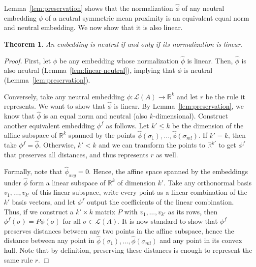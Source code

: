 \documentclass[10pt,letterpaper]{article}
\newcommand{\calL}{{\mathcal{L}}}
\newcommand{\rank}{{\calL(A)}}
\newtheorem{theorem}{Theorem}
\begin{document}
Lemma~\ref{lem:preservation} shows that the normalization $\hat{\phi}$ of any neutral embedding $\phi$ of a neutral symmetric mean proximity is an equivalent equal norm and neutral embedding. We now show that it is also linear.  


\begin{theorem}
An embedding is neutral if and only if its normalization is linear. 
\label{thm:neutral-linear}
\end{theorem}
\begin{proof}
First, let $\phi$ be any embedding whose normalization $\hat{\phi}$ is linear. Then, $\hat{\phi}$ is also neutral (Lemma~\ref{lem:linear-neutral}), implying that $\phi$ is neutral (Lemma~\ref{lem:preservation}).

Conversely, take any neutral embedding $\phi : \rank \rightarrow \mathbb{R}^k$ and let $r$ be the rule it represents. We want to show that $\hat{\phi}$ is linear. By Lemma~\ref{lem:preservation}, we know that $\hat{\phi}$ is an equal norm and neutral (also $k$-dimensional). Construct another equivalent embedding $\phi^f$ as follows. Let $k' \le k$ be the dimension of the affine subspace of $\mathbb{R}^k$ spanned by the points $\hat{\phi}(\sigma_1),\ldots,\hat{\phi}(\sigma_{m!})$. If $k' = k$, then take $\phi^f = \hat{\phi}$. Otherwise, $k' < k$ and we can transform the points to $\mathbb{R}^{k'}$ to get $\phi^f$ that preserves all distances, and thus represents $r$ as well. 

Formally, note that $\hat{\phi}_{avg} = 0$. Hence, the affine space spanned by the embeddings under $\hat{\phi}$ form a linear subspace of $\mathbb{R}^k$ of dimension $k'$. Take any orthonormal basis $v_1,\ldots,v_{k'}$ of this linear subspace, write every point as a linear combination of the $k'$ basis vectors, and let $\phi^f$ output the coefficients of the linear combination. Thus, if we construct a $k' \times k$ matrix $P$ with $v_1,\ldots,v_{k'}$ as its rows, then $\phi^f(\sigma) = P \phi(\sigma)$ for all $\sigma \in \rank$. It is now standard to show that $\phi^f$ preserves distances between any two points in the affine subspace, hence the distance between any point in $\hat{\phi}(\sigma_1),\ldots,\hat{\phi}(\sigma_{m!})$ and any point in its convex hull. Note that by definition, preserving these distances is enough to represent the same rule $r$. 


\end{proof}
\end{document}
